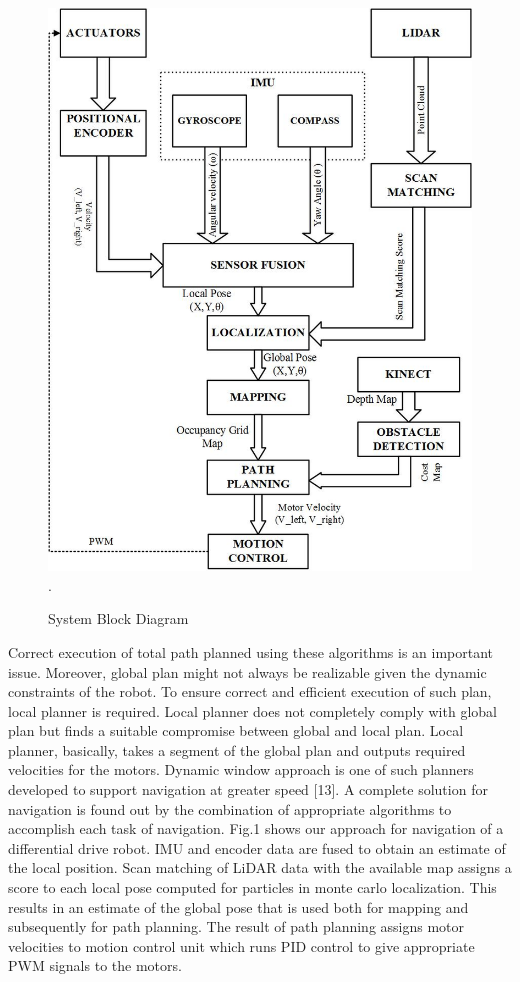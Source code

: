 \documentclass[journal,twoside]{IEEEtran}
\begin{document}
\begin{figure}[h]
\centering
\includegraphics[scale=.3]{1.jpg}
\DeclareGraphicsExtensions.
\caption{System Block Diagram}
\end{figure}
\par\noindent Correct execution of total path planned using these algorithms is an important issue. Moreover, global plan might not always be realizable given the dynamic constraints of the robot. To ensure correct and efficient execution of such plan, local planner is required. Local planner does not completely comply with global plan but finds a suitable compromise between global and local plan. Local planner, basically, takes a segment of the global plan and outputs required velocities for the motors. Dynamic window approach is one of such planners developed to support navigation at greater speed [13]. A complete solution for navigation is found out by the combination of appropriate algorithms to accomplish each task of navigation. Fig.1 shows our approach for navigation of a differential drive robot. IMU and encoder data are fused to obtain an estimate of the local position. Scan matching of LiDAR data with the available map assigns a score to each local pose computed for particles in monte carlo localization. This results in an estimate of the global pose that is used both for mapping and subsequently for path planning. The result of path planning assigns motor velocities to motion control unit which runs PID control to give appropriate PWM signals to the motors.
\end{document}

